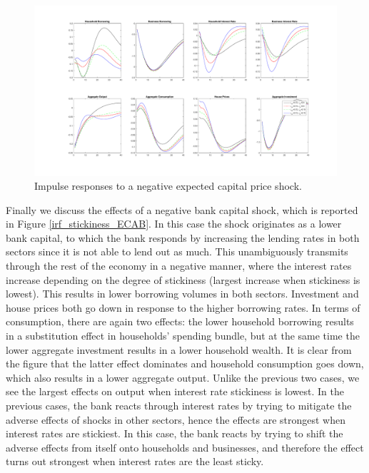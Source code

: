 \documentclass[12pt]{article}
\numberwithin{equation}{section}
\begin{document}
\begin{figure}[H]
\centering
\caption{Impulse responses to a negative expected capital price shock.}
\label{irf_stickiness_EbF}
\includegraphics[scale=0.4]{stickinessNegativeShocksEbF.pdf}
\end{figure}


Finally we discuss the effects of a negative bank capital shock, which is reported in Figure \ref{irf_stickiness_ECAB}. In this case the shock originates as a lower bank capital, to which the bank responds by increasing the lending rates in both sectors since it is not able to lend out as much. This unambiguously transmits through the rest of the economy in a negative manner, where the interest rates increase depending on the degree of stickiness (largest increase when stickiness is lowest). This results in lower borrowing volumes in both sectors. Investment and house prices both go down in response to the higher borrowing rates. In terms of consumption, there are again two effects: the lower household borrowing results in a substitution effect in households' spending bundle, but at the same time the lower aggregate investment results in a lower household wealth. It is clear from the figure that the latter effect dominates and household consumption goes down, which also results in a lower aggregate output. Unlike the previous two cases, we see the largest effects on output when interest rate stickiness is lowest. In the previous cases, the bank reacts through interest rates by trying to mitigate the adverse effects of shocks in other sectors, hence the effects are strongest when interest rates are stickiest. In this case, the bank reacts by trying to shift the adverse effects from itself onto households and businesses, and therefore the effect turns out strongest when interest rates are the least sticky. 
\end{document}
